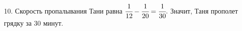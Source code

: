 10. Скорость пропалывания Тани равна $\cfrac{1}{12}-\cfrac{1}{20}=\cfrac{1}{30}.$ Значит, Таня прополет грядку за 30 минут.\\
